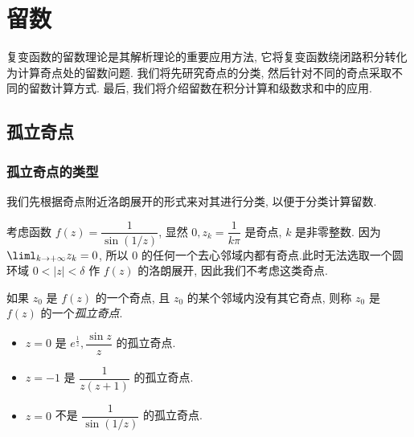 \chapter{留数}
\label{chapter:5}

复变函数的留数理论是其解析理论的重要应用方法, 它将复变函数绕闭路积分转化为计算奇点处的留数问题.
我们将先研究奇点的分类, 然后针对不同的奇点采取不同的留数计算方式.
最后, 我们将介绍留数在积分计算和级数求和中的应用.

\section{孤立奇点}

\subsection{孤立奇点的类型}

我们先根据奇点附近洛朗展开的形式来对其进行分类, 以便于分类计算留数.

\begin{example}
		考虑函数 $f(z)=\dfrac1{\sin(1/z)}$, 显然 $0,z_k=\dfrac1{k\pi}$ 是奇点, $k$ 是非零整数.
	{因为 $\liml_{k\to+\infty} z_k=0$, 所以 $0$ 的任何一个去心邻域内都有奇点.此时无法选取一个圆环域 $0<|z|<\delta$ 作 $f(z)$ 的洛朗展开, 因此我们不考虑这类奇点.
	}
	{
	\begin{center}
	\end{center}}
\end{example}

\begin{definition}
	如果 $z_0$ 是 $f(z)$ 的一个奇点, 且 $z_0$ 的某个邻域内没有其它奇点, 则称 $z_0$ 是 $f(z)$ 的一个\emph{孤立奇点}.
\end{definition}

\begin{example}
	\begin{itemize}
		\item $z=0$ 是 $e^{\frac1z},\dfrac{\sin z}z$ 的孤立奇点.
		\item $z=-1$ 是 $\dfrac1{z(z+1)}$ 的孤立奇点.
		\item $z=0$ 不是 $\dfrac1{\sin(1/z)}$ 的孤立奇点.
	\end{itemize}
\end{example}

